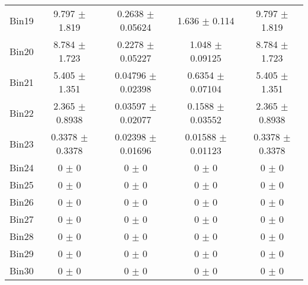 \begin{tabular}{@{\extracolsep{4pt}}lcccc@{}}
     Bin19 & 9.797 $\pm$ 1.819 & 0.2638 $\pm$ 0.05624 & 1.636 $\pm$ 0.114 & 9.797 $\pm$ 1.819 \\ 
     Bin20 & 8.784 $\pm$ 1.723 & 0.2278 $\pm$ 0.05227 & 1.048 $\pm$ 0.09125 & 8.784 $\pm$ 1.723 \\ 
     Bin21 & 5.405 $\pm$ 1.351 & 0.04796 $\pm$ 0.02398 & 0.6354 $\pm$ 0.07104 & 5.405 $\pm$ 1.351 \\ 
     Bin22 & 2.365 $\pm$ 0.8938 & 0.03597 $\pm$ 0.02077 & 0.1588 $\pm$ 0.03552 & 2.365 $\pm$ 0.8938 \\ 
     Bin23 & 0.3378 $\pm$ 0.3378 & 0.02398 $\pm$ 0.01696 & 0.01588 $\pm$ 0.01123 & 0.3378 $\pm$ 0.3378 \\ 
     Bin24 & 0 $\pm$ 0 & 0 $\pm$ 0 & 0 $\pm$ 0 & 0 $\pm$ 0 \\ 
     Bin25 & 0 $\pm$ 0 & 0 $\pm$ 0 & 0 $\pm$ 0 & 0 $\pm$ 0 \\ 
     Bin26 & 0 $\pm$ 0 & 0 $\pm$ 0 & 0 $\pm$ 0 & 0 $\pm$ 0 \\ 
     Bin27 & 0 $\pm$ 0 & 0 $\pm$ 0 & 0 $\pm$ 0 & 0 $\pm$ 0 \\ 
     Bin28 & 0 $\pm$ 0 & 0 $\pm$ 0 & 0 $\pm$ 0 & 0 $\pm$ 0 \\ 
     Bin29 & 0 $\pm$ 0 & 0 $\pm$ 0 & 0 $\pm$ 0 & 0 $\pm$ 0 \\ 
     Bin30 & 0 $\pm$ 0 & 0 $\pm$ 0 & 0 $\pm$ 0 & 0 $\pm$ 0 \\ 
\hline\hline
  \end{tabular}
